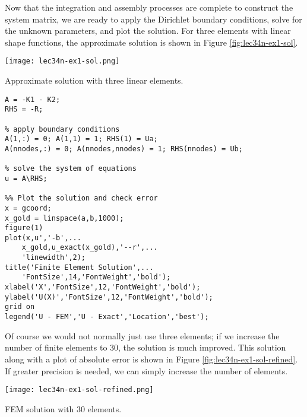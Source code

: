 Now that the integration and assembly processes are complete to construct the system matrix, we are ready to apply the Dirichlet boundary conditions, solve for the unknown parameters, and plot the solution.  For three elements with linear shape functions, the approximate solution is shown in Figure \ref{fig:lec34n-ex1-sol}.
\begin{marginfigure}
\texttt{[image: lec34n-ex1-sol.png]}
\caption{Approximate solution with three linear elements.}
\label{fig:lec34n-ex1-sol}
\end{marginfigure}
\begin{lstlisting}[style=myMatlab,name=lec34n-ex1]
% Gather into system matrix and vector
A = -K1 - K2;
RHS = -R;

% apply boundary conditions
A(1,:) = 0; A(1,1) = 1; RHS(1) = Ua;
A(nnodes,:) = 0; A(nnodes,nnodes) = 1; RHS(nnodes) = Ub;

% solve the system of equations
u = A\RHS;

%% Plot the solution and check error
x = gcoord;
x_gold = linspace(a,b,1000);
figure(1)
plot(x,u','-b',...
    x_gold,u_exact(x_gold),'--r',...
    'linewidth',2);
title('Finite Element Solution',...
    'FontSize',14,'FontWeight','bold');
xlabel('X','FontSize',12,'FontWeight','bold');
ylabel('U(X)','FontSize',12,'FontWeight','bold');
grid on
legend('U - FEM','U - Exact','Location','best');
\end{lstlisting}
Of course we would not normally just use three elements; if we increase the number of finite elements to 30, the solution is much improved.  This solution along with a plot of absolute error is shown in Figure \ref{fig:lec34n-ex1-sol-refined}.  If greater precision is needed, we can simply increase the number of elements.
\begin{marginfigure}[-5.0cm]
\texttt{[image: lec34n-ex1-sol-refined.png]}
\caption{FEM solution with 30 elements.}
\label{fig:lec34n-ex1-sol-refined}
\end{marginfigure}

